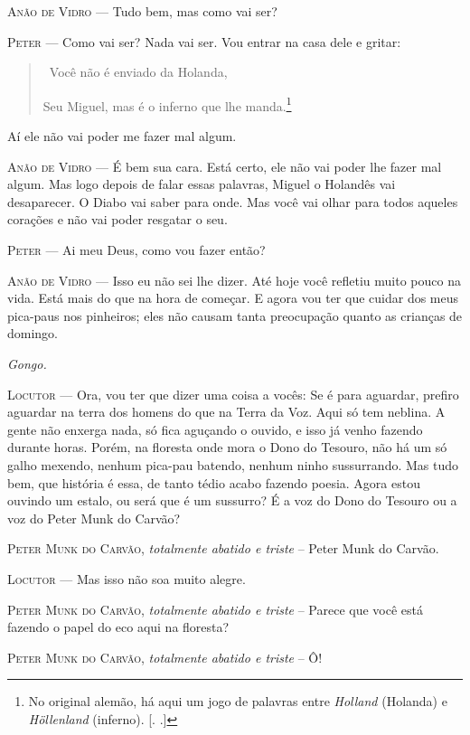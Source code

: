 \textsc{Anão de Vidro} --- Tudo bem, mas como vai ser?

\textsc{Peter} --- Como vai ser? Nada vai ser. Vou entrar na casa dele e gritar:

\begin{quote}
\quad \, Você não é enviado da Holanda,

Seu Miguel, mas é o inferno que lhe manda.\footnote{No original alemão,
  há aqui um jogo de palavras entre \emph{Holland} (Holanda) e
  \emph{Höllenland} (inferno). [. .]}
\end{quote}

Aí ele não vai poder me fazer mal algum.

\textsc{Anão de Vidro} --- É bem sua cara. Está certo, ele não vai poder lhe fazer
mal algum. Mas logo depois de falar essas palavras, Miguel o Holandês
vai desaparecer. O Diabo vai saber para onde. Mas você vai olhar para
todos aqueles corações e não vai poder resgatar o seu.

\textsc{Peter} --- Ai meu Deus, como vou fazer então?

\textsc{Anão de Vidro} --- Isso eu não sei lhe dizer. Até hoje você refletiu muito
pouco na vida. Está mais do que na hora de começar. E agora vou ter que
cuidar dos meus pica-paus nos pinheiros; eles não causam tanta
preocupação quanto as crianças de domingo.

\emph{Gongo.}

\textsc{Locutor} --- Ora, vou ter que dizer uma coisa a vocês: Se é para aguardar,
prefiro aguardar na terra dos homens do que na Terra da Voz. Aqui só tem
neblina. A gente não enxerga nada, só fica aguçando o ouvido, e isso já
venho fazendo durante horas. Porém, na floresta onde mora o Dono do
Tesouro, não há um só galho mexendo, nenhum pica-pau batendo, nenhum
ninho sussurrando. Mas tudo bem, que história é essa, de tanto tédio
acabo fazendo poesia. Agora estou ouvindo um estalo, ou será que é um
sussurro? É a voz do Dono do Tesouro ou a voz do Peter Munk do Carvão?

\textsc{Peter Munk do Carvão}, \emph{totalmente abatido e triste} -- Peter Munk
do Carvão.

\textsc{Locutor} --- Mas isso não soa muito alegre.

\textsc{Peter Munk do Carvão}, \emph{totalmente abatido e triste} -- Parece que
você está fazendo o papel do eco aqui na floresta?

\textsc{Peter Munk do Carvão}, \emph{totalmente abatido e triste} -- Ô!


